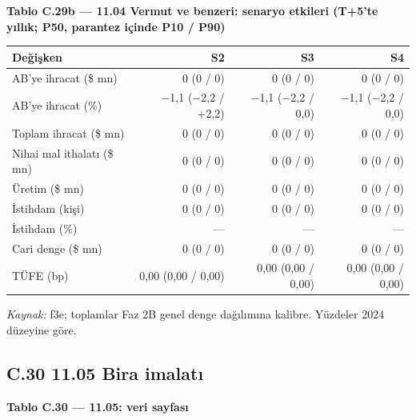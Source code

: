 \endgroup


\textbf{Tablo C.29b --- 11.04 Vermut ve benzeri: senaryo etkileri (T+5'te yıllık; P50, parantez içinde P10 / P90)}

\nopagebreak[4]

\begingroup\gbtablo\small

\begin{longtable}[]{@{}lrrr@{}}
\toprule\noalign{}
\textbf{Değişken} & \textbf{S2} & \textbf{S3} & \textbf{S4} \\
\midrule\noalign{}
\endhead
\bottomrule\noalign{}
\endlastfoot
AB'ye ihracat (\$ mn) & 0 (0 / 0) & 0 (0 / 0) & 0 (0 / 0) \\
AB'ye ihracat (\%) & −1,1 (−2,2 / +2,2) & −1,1 (−2,2 / 0,0) & −1,1 (−2,2 / 0,0) \\
Toplam ihracat (\$ mn) & 0 (0 / 0) & 0 (0 / 0) & 0 (0 / 0) \\
Nihai mal ithalatı (\$ mn) & 0 (0 / 0) & 0 (0 / 0) & 0 (0 / 0) \\
Üretim (\$ mn) & 0 (0 / 0) & 0 (0 / 0) & 0 (0 / 0) \\
İstihdam (kişi) & 0 (0 / 0) & 0 (0 / 0) & 0 (0 / 0) \\
İstihdam (\%) & --- & --- & --- \\
Cari denge (\$ mn) & 0 (0 / 0) & 0 (0 / 0) & 0 (0 / 0) \\
TÜFE (bp) & 0,00 (0,00 / 0,00) & 0,00 (0,00 / 0,00) & 0,00 (0,00 / 0,00) \\
\end{longtable}

\endgroup

\emph{Kaynak:} \etiketT{} f3e; toplamlar Faz 2B genel denge dağılımına kalibre. Yüzdeler 2024 düzeyine göre.

\hypertarget{nace_kartlar_10-12-c30-1105-bira-imalatux131}{%
\subsection{C.30 11.05 Bira imalatı}\label{nace_kartlar_10-12-c30-1105-bira-imalatux131}}


\textbf{Tablo C.30 --- 11.05: veri sayfası}

\nopagebreak[4]

\begingroup\gbtablo\small

